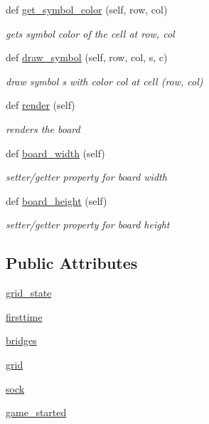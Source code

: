 \begin{DoxyCompactItemize}
def \hyperlink{classbridges_1_1gamebase_1_1_game_base_a7cb6637713536701e89e870a5a3428a1}{get\+\_\+symbol\+\_\+color} (self, row, col)
\begin{DoxyCompactList}\small\item\em gets symbol color of the cell at row, col \end{DoxyCompactList}\item 
def \hyperlink{classbridges_1_1gamebase_1_1_game_base_a6c9a7b7e5d84874f42a6150ec25d3791}{draw\+\_\+symbol} (self, row, col, s, c)
\begin{DoxyCompactList}\small\item\em draw symbol s with color col at cell (row, col) \end{DoxyCompactList}\item 
def \hyperlink{classbridges_1_1gamebase_1_1_game_base_a3ae3bcb9702097029509d4123bc9276e}{render} (self)
\begin{DoxyCompactList}\small\item\em renders the board \end{DoxyCompactList}\item 
def \hyperlink{classbridges_1_1gamebase_1_1_game_base_a46a635c075e1a0a651e4caa18369494d}{board\+\_\+width} (self)
\begin{DoxyCompactList}\small\item\em setter/getter property for board width \end{DoxyCompactList}\item 
def \hyperlink{classbridges_1_1gamebase_1_1_game_base_ad1595582d3b02aa4225efed3beab935f}{board\+\_\+height} (self)
\begin{DoxyCompactList}\small\item\em setter/getter property for board height \end{DoxyCompactList}\end{DoxyCompactItemize}
\subsection*{Public Attributes}
\begin{DoxyCompactItemize}
\item 
\hyperlink{classbridges_1_1gamebase_1_1_game_base_ae397f4d601671d036d9c92902ba2d7f1}{grid\+\_\+state}
\item 
\hyperlink{classbridges_1_1gamebase_1_1_game_base_a1115f9b91c925f4aa5155ec0e7831ee2}{firsttime}
\item 
\hyperlink{classbridges_1_1gamebase_1_1_game_base_a2310e51f398c089ca945b3af38c09231}{bridges}
\item 
\hyperlink{classbridges_1_1gamebase_1_1_game_base_a556463882cb4a3a00c6c356d1c4a4322}{grid}
\item 
\hyperlink{classbridges_1_1gamebase_1_1_game_base_a4a7fe2d524c02966900937bddea195e7}{sock}
\item 
\hyperlink{classbridges_1_1gamebase_1_1_game_base_a3686759454ab901fcb4afb81572b3104}{game\+\_\+started}
\end{DoxyCompactItemize}
